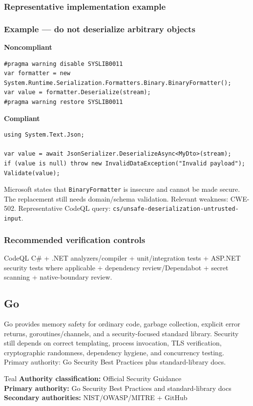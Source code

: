 \documentclass[10pt,letterpaper]{article}
\newcommand{\code}[1]{\texttt{\small #1}}
\begin{document}
\subsubsection*{Representative implementation example}
\subsubsection*{Example --- do not deserialize arbitrary objects}

\textbf{Noncompliant}\par
\begin{lstlisting}[language={[Sharp]C}]
#pragma warning disable SYSLIB0011
var formatter = new System.Runtime.Serialization.Formatters.Binary.BinaryFormatter();
var value = formatter.Deserialize(stream);
#pragma warning restore SYSLIB0011
\end{lstlisting}

\textbf{Compliant}\par
\begin{lstlisting}[language={[Sharp]C}]
using System.Text.Json;

var value = await JsonSerializer.DeserializeAsync<MyDto>(stream);
if (value is null) throw new InvalidDataException("Invalid payload");
Validate(value);
\end{lstlisting}

Microsoft states that \code{BinaryFormatter} is insecure and cannot be made secure. The replacement still needs domain/schema validation. Relevant weakness: CWE-502. Representative CodeQL query: \code{cs/\allowbreak unsafe-\allowbreak deserialization-\allowbreak untrusted-\allowbreak input}.\par
\subsubsection*{Recommended verification controls}
CodeQL C\# + .NET analyzers/compiler + unit/integration tests + ASP.NET security tests where applicable + dependency review/Dependabot + secret scanning + native-boundary review.
\clearpage
\subsection{Go}
Go provides memory safety for ordinary code, garbage collection, explicit error returns, goroutines/channels, and a security-focused standard library. Security still depends on correct templating, process invocation, TLS verification, cryptographic randomness, dependency hygiene, and concurrency testing. Primary authority: Go Security Best Practices plus standard-library docs.
\begin{callout}{Teal}
\textbf{Authority classification:} Official Security Guidance\\
\textbf{Primary authority:} Go Security Best Practices and standard-library docs\\
\textbf{Secondary authorities:} NIST/OWASP/MITRE + GitHub
\end{callout}
\end{document}
